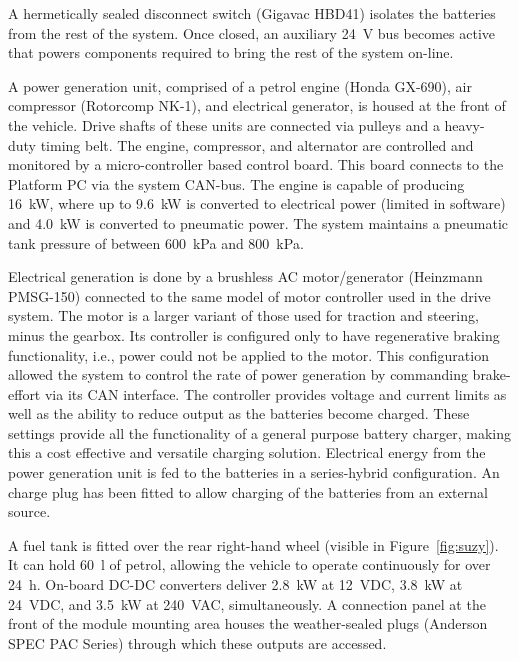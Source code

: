 \documentclass[preprint,authoryear,12pt]{elsarticle}
\begin{document}
        A hermetically sealed disconnect switch (Gigavac HBD41) isolates the batteries from the rest of the system.
        Once closed, an auxiliary \SI{24}{\volt} bus becomes active that powers components required to bring the rest of the system on-line.

        A power generation unit, comprised of a petrol engine (Honda GX-690), air compressor (Rotorcomp NK-1), and electrical generator, is housed at the front of the vehicle.
        Drive shafts of these units are connected via pulleys and a heavy-duty timing belt.
        The engine, compressor, and alternator are controlled and monitored by a micro-controller based control board.
        This board connects to the Platform PC via the system CAN-bus.
        The engine is capable of producing \SI{16}{\kilo\watt}, where up to \SI{9.6}{\kilo\watt} is converted to electrical power (limited in software) and \SI{4.0}{\kilo\watt} is converted to pneumatic power.
        The system maintains a pneumatic tank pressure of between \SI{600}{\kilo\pascal} and \SI{800}{\kilo\pascal}.

        Electrical generation is done by a brushless AC motor/generator (Heinzmann PMSG-150) connected to the same model of motor controller used in the drive system.
        The motor is a larger variant of those used for traction and steering, minus the gearbox.
        Its controller is configured only to have regenerative braking functionality, i.e., power could not be applied to the motor.
        This configuration allowed the system to control the rate of power generation by commanding brake-effort via its CAN interface.
        The controller provides voltage and current limits as well as the ability to reduce output as the batteries become charged.
        These settings provide all the functionality of a general purpose battery charger, making this a cost effective and versatile charging solution.
        Electrical energy from the power generation unit is fed to the batteries in a series-hybrid configuration.
        An charge plug has been fitted to allow charging of the batteries from an external source.

        A fuel tank is fitted over the rear right-hand wheel (visible in Figure~\ref{fig:suzy}).
        It can hold \SI{60}{\litre} of petrol, allowing the vehicle to operate continuously for over \SI{24}{\hour}.
        On-board DC-DC converters deliver \SI{2.8}{\kilo\watt} at \SI{12}{\volt}DC, \SI{3.8}{\kilo\watt} at \SI{24}{\volt}DC, and \SI{3.5}{\kilo\watt} at \SI{240}{\volt}AC, simultaneously.
        A connection panel at the front of the module mounting area houses the weather-sealed plugs (Anderson SPEC PAC Series) through which these outputs are accessed.
\end{document}
